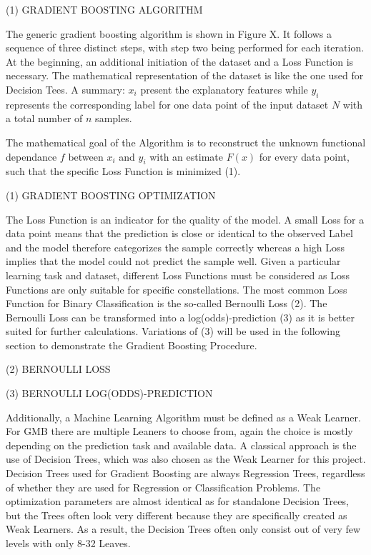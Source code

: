(1) GRADIENT BOOSTING ALGORITHM 

The generic gradient boosting algorithm is shown in Figure X. It follows a sequence of three 
distinct steps, with step two being performed for each iteration. At the beginning, an 
additional initiation of the dataset and a Loss Function is necessary. The mathematical 
representation of the dataset is like the one used for Decision Tees. A summary: \(x_{i}\) present the 
explanatory features while \(y_{i}\) represents the corresponding label for one data point of the input 
dataset \(N\) with a total number of \(n\) samples. 

The mathematical goal of the Algorithm is to reconstruct the unknown functional dependance \(f\) 
between \(x_{i}\) and \(y_{i}\) with an estimate \(F(x)\) for every data point, such that the specific Loss 
Function is minimized (1). 

(1) GRADIENT BOOSTING OPTIMIZATION 

The Loss Function is an indicator for the quality of the model. A small Loss for a data point 
means that the prediction is close or identical to the observed Label and the model therefore 
categorizes the sample correctly whereas a high Loss implies that the model could not predict 
the sample well. Given a particular learning task and dataset, different Loss Functions must 
be considered as Loss Functions are only suitable for specific constellations. The most common 
Loss Function for Binary Classification is the so-called Bernoulli Loss (2). The Bernoulli Loss 
can be transformed into a log(odds)-prediction (3) as it is better suited for further calculations. 
Variations of (3) will be used in the following section to demonstrate the Gradient Boosting 
Procedure. 

(2) BERNOULLI LOSS 

(3) BERNOULLI LOG(ODDS)-PREDICTION 

Additionally, a Machine Learning Algorithm must be defined as a Weak Learner. For GMB there 
are multiple Leaners to choose from, again the choice is mostly depending on the prediction 
task and available data. A classical approach is the use of Decision Trees, which was also 
chosen as the Weak Learner for this project. Decision Trees used for Gradient Boosting are 
always Regression Trees, regardless of whether they are used for Regression or Classification 
Problems. The optimization parameters are almost identical as for standalone Decision Trees, 
but the Trees often look very different because they are specifically created as Weak Learners. 
As a result, the Decision Trees often only consist out of very few levels with only 8-32 Leaves.

